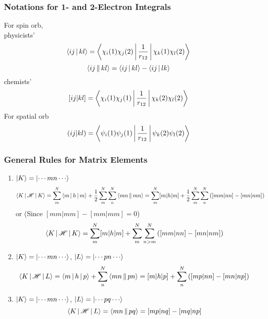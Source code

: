 \documentclass[a4paper]{article}
\numberwithin{equation}{section}
\begin{document}
\subsubsection{Notations for 1- and 2-Electron Integrals}
For spin orb,\\
physicists'
\begin{equation}\label{key}
\Braket{ij|kl} = \Braket{\chi_i(1)\chi_j(2) | \dfrac{1}{r_{12}} | \chi_k(1)\chi_l(2)}
\end{equation}
\begin{equation}\label{key}
\Braket{ij||kl} = \Braket{ij|kl} - \Braket{ij|lk}
\end{equation}
chemists'
\begin{equation}\label{key}
[ij|kl] = \Braket{\chi_i(1)\chi_j(1) | \dfrac{1}{r_{12}} | \chi_k(2)\chi_l(2)}
\end{equation}
For spatial orb
\begin{equation}\label{key}
(ij|kl) = \Braket{\psi_i(1)\psi_j(1) | \dfrac{1}{r_{12}} | \psi_k(2)\psi_l(2)}
\end{equation}

\subsubsection{General Rules for Matrix Elements}
\begin{enumerate}
	\item $ \ket{K} = \ket{\cdots m n\cdots} $
	\begin{equation}\label{key}
	\Braket{K | \mathscr{H} | K} = \sum_m^N \Braket{m|h|m} + \dfrac{1}{2}\sum_m^N\sum_n^N \Braket{mn||mn} = \sum_m^N [m|h|m] + \dfrac{1}{2}\sum_m^N\sum_n^N \qty([mm|nn] - [mn|nm])
	\end{equation}
	or (Since $ [mm|mm] - [mm|mm] = 0 $)
	\begin{equation}\label{key}
	\Braket{K | \mathscr{H} | K} = \sum_m^N [m|h|m] + \sum_m^N\sum_{n>m}^N \qty([mm|nn] - [mn|nm])
	\end{equation}
	\item $ \ket{K} = \ket{\cdots m n\cdots} $, $ \ket{L} = \ket{\cdots p n\cdots} $
	\begin{equation}\label{key}
	\Braket{K | \mathscr{H} | L} = \Braket{m|h|p} + \sum_n^N \Braket{mn||pn} = [m|h|p] + \sum_n^N \qty([mp|nn] - [mn|np])
	\end{equation}
	\item $ \ket{K} = \ket{\cdots m n\cdots} $, $ \ket{L} = \ket{\cdots p q\cdots} $
	\begin{equation}\label{key}
	\Braket{K | \mathscr{H} | L} = \Braket{mn||pq} = [mp|nq] - [mq|np]
	\end{equation}
\end{enumerate}
\end{document}
